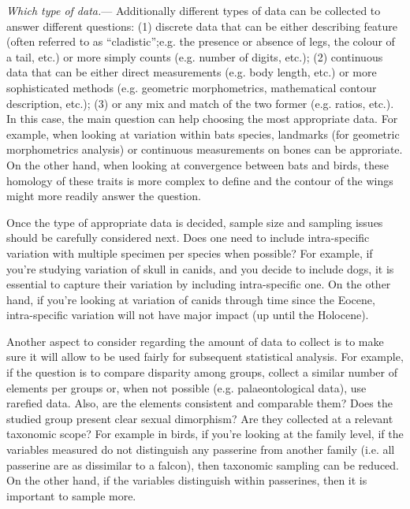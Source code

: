 \documentclass[12pt,letterpaper]{article}
\renewcommand{\subsubsection}[1]{%
\vspace{2ex}
\noindent
\textit{#1.}---}
\begin{document}
\subsubsection{Which type of data}
Additionally different types of data can be collected to answer different questions:
(1) discrete data that can be either describing feature (often referred to as ``cladistic'';e.g. the presence or absence of legs, the colour of a tail, etc.) or more simply counts (e.g. number of digits, etc.);
(2) continuous data that can be either direct measurements (e.g. body length, etc.) or more sophisticated methods (e.g. geometric morphometrics, mathematical contour description, etc.);
(3) or any mix and match of the two former (e.g. ratios, etc.).
In this case, the main question can help choosing the most appropriate data.
For example, when looking at variation within bats species, landmarks (for geometric morphometrics analysis) or continuous measurements on bones can be approriate.
On the other hand, when looking at convergence between bats and birds, these homology of these traits is more complex to define and the contour of the wings might more readily answer the question.

Once the type of appropriate data is decided, sample size and sampling issues should be carefully considered next.
Does one need to include intra-specific variation with multiple specimen per species when possible?
For example, if you're studying variation of skull in canids, and you decide to include dogs, it is essential to capture their variation by including intra-specific one.
On the other hand, if you're looking at variation of canids through time since the Eocene, intra-specific variation will not have major impact (up until the Holocene). %

Another aspect to consider regarding the amount of data to collect is to make sure it will allow to be used fairly for subsequent statistical analysis.
For example, if the question is to compare disparity among groups, collect a similar number of elements per groups or, when not possible (e.g. palaeontological data), use rarefied data.
Also, are the elements consistent and comparable them?
Does the studied group present clear sexual dimorphism?
Are they collected at a relevant taxonomic scope?
For example in birds, if you're looking at the family level, if the variables measured do not distinguish any passerine from another family (i.e. all passerine are as dissimilar to a falcon), then taxonomic sampling can be reduced. On the other hand, if the variables distinguish within passerines, then it is important to sample more.
\end{document}
